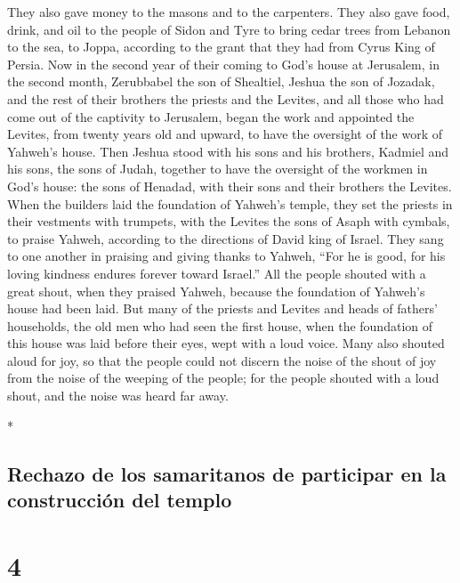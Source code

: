 \begin{paracol}{2}
\begin{otherlanguage}{english}
 They also gave money to the masons and to the carpenters.
They also gave food, drink, and oil to the people of Sidon and Tyre to
bring cedar trees from Lebanon to the sea, to Joppa, according to the
grant that they had from Cyrus King of Persia.  Now in the
second year of their coming to God's house at Jerusalem, in the second
month, Zerubbabel the son of Shealtiel, Jeshua the son of Jozadak, and
the rest of their brothers the priests and the Levites, and all those
who had come out of the captivity to Jerusalem, began the work and
appointed the Levites, from twenty years old and upward, to have the
oversight of the work of Yahweh's house.  Then Jeshua
stood with his sons and his brothers, Kadmiel and his sons, the sons of
Judah, together to have the oversight of the workmen in God's house: the
sons of Henadad, with their sons and their brothers the Levites.
 When the builders laid the foundation of Yahweh's
temple, they set the priests in their vestments with trumpets, with the
Levites the sons of Asaph with cymbals, to praise Yahweh, according to
the directions of David king of Israel.  They sang to one
another in praising and giving thanks to Yahweh, ``For he is good, for
his loving kindness endures forever toward Israel.'' All the people
shouted with a great shout, when they praised Yahweh, because the
foundation of Yahweh's house had been laid.  But many of
the priests and Levites and heads of fathers' households, the old men
who had seen the first house, when the foundation of this house was laid
before their eyes, wept with a loud voice. Many also shouted aloud for
joy,  so that the people could not discern the noise of
the shout of joy from the noise of the weeping of the people; for the
people shouted with a loud shout, and the noise was heard far away.

\end{otherlanguage}

\switchcolumn[0]*

\hypertarget{rechazo-de-los-samaritanos-de-participar-en-la-construcciuxf3n-del-templo}{%
\subsection{Rechazo de los samaritanos de participar en la construcción
del
templo}\label{rechazo-de-los-samaritanos-de-participar-en-la-construcciuxf3n-del-templo}}

\hypertarget{section-6}{%
\section{4}\label{section-6}}


\end{paracol}
